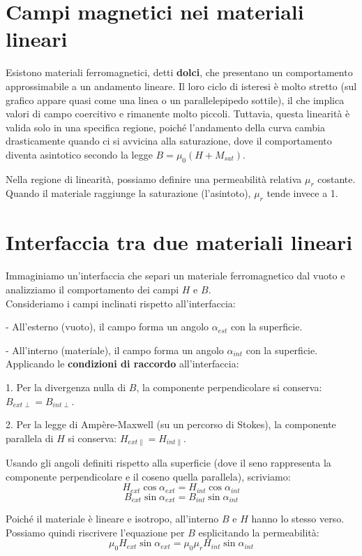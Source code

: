 \documentclass{book}
\begin{document}
\section{Campi magnetici nei materiali lineari}

Esistono materiali ferromagnetici, detti \textbf{dolci}, che presentano un comportamento approssimabile a un andamento lineare. Il loro ciclo di isteresi è molto stretto (sul grafico appare quasi come una linea o un parallelepipedo sottile), il che implica valori di campo coercitivo e rimanente molto piccoli.
Tuttavia, questa linearità è valida solo in una specifica regione, poiché l'andamento della curva cambia drasticamente quando ci si avvicina alla saturazione, dove il comportamento diventa asintotico secondo la legge $B=\mu_0(H+M_{sat})$.

Nella regione di linearità, possiamo definire una permeabilità relativa $\mu_r$ costante. Quando il materiale raggiunge la saturazione (l'asintoto), $\mu_r$ tende invece a 1.

\section{Interfaccia tra due materiali lineari}

Immaginiamo un'interfaccia che separi un materiale ferromagnetico dal vuoto e analizziamo il comportamento dei campi $H$ e $B$.
\\
Consideriamo i campi inclinati rispetto all'interfaccia:

- All'esterno (vuoto), il campo forma un angolo $\alpha_{est}$ con la superficie.

- All'interno (materiale), il campo forma un angolo $\alpha_{int}$ con la superficie.
\\
Applicando le \textbf{condizioni di raccordo} all'interfaccia:

1.  Per la divergenza nulla di $B$, la componente perpendicolare si conserva: $B_{ext \perp} = B_{int \perp}$.

2.  Per la legge di Ampère-Maxwell (su un percorso di Stokes), la componente parallela di $H$ si conserva: $H_{ext \parallel} = H_{int \parallel}$.

Usando gli angoli definiti rispetto alla superficie (dove il seno rappresenta la componente perpendicolare e il coseno quella parallela), scriviamo:
$$
H_{ext} \cos\alpha_{ext} = H_{int} \cos\alpha_{int}
$$
$$
B_{ext} \sin\alpha_{ext} = B_{int} \sin\alpha_{int}
$$

Poiché il materiale è lineare e isotropo, all'interno $B$ e $H$ hanno lo stesso verso. Possiamo quindi riscrivere l'equazione per $B$ esplicitando la permeabilità:
$$
\mu_0 H_{ext} \sin\alpha_{ext} = \mu_0 \mu_r H_{int} \sin\alpha_{int}
$$
\end{document}
